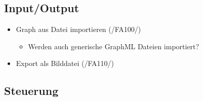 \subsection{Input/Output}
\begin{itemize}
	\item Graph aus Datei importieren (/FA100/)
		\begin{itemize}
			\item Werden auch generische GraphML Dateien importiert?
		\end{itemize}
	\item Export als Bilddatei (/FA110/)
\end{itemize}

\subsection{Steuerung}
\label{implkrit:steuerung}
